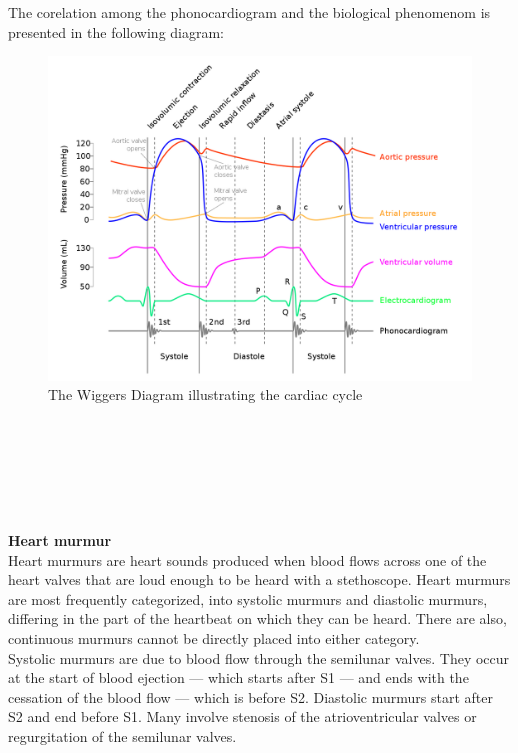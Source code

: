 \documentclass[11pt, a4papper]{report}
\theoremstyle{plain}
\theoremstyle{definition}
\theoremstyle{definition}
\theoremstyle{proposition}
\begin{document}
The corelation among the phonocardiogram and the biological phenomenom is presented in the following diagram:

\begin{figure}[h]
\includegraphics[width=15cm]{Wiggers_Diagram_2.png}
\centering
\caption{The Wiggers Diagram illustrating the cardiac cycle}
\end{figure}
\
\\
\
\\
\
\\
\
\\
\

\textbf{Heart murmur}
\\

Heart murmurs are heart sounds produced when blood flows across one of the heart valves that are loud enough to be heard with a stethoscope. Heart murmurs are most frequently categorized, into systolic murmurs and diastolic murmurs, differing in the part of the heartbeat on which they can be heard. There are also, continuous murmurs cannot be directly placed into either category.
\\

Systolic murmurs are due to blood flow through the semilunar valves. They occur at the start of blood ejection — which starts after S1 — and ends with the cessation of the blood flow — which is before S2. Diastolic murmurs start after S2 and end before S1. Many involve stenosis of the atrioventricular valves or regurgitation of the semilunar valves.
\\
\
\\
\end{document}

